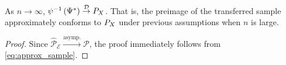 \begin{proposition}
  \label{prop:convergence} As $n \to \infty$, $\psi^{-1}\left(\Psi^*\right) \stackrel{\mathcal{D}}{\to} P_{\var{x}}$. That is, the preimage of the transferred sample approximately conforms to  $P_{\var{X}}$ under previous assumptions when $n$ is large.
\end{proposition}
\begin{proof}
Since $\hat{\mathcal{P}}_\mathcal{E} \overset{\text{asymp.}}{\to} \mathcal{P}$, the proof immediately follows from \eqref{eq:approx_sample}.
\end{proof}




